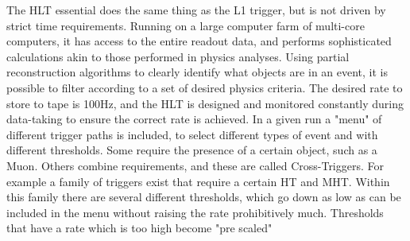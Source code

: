 The HLT essential does the same thing as the L1 trigger, but is not driven by strict time requirements. Running on a large computer farm of multi-core computers, it has access to the entire readout data, and performs sophisticated calculations akin to those performed in physics analyses. Using partial reconstruction algorithms to clearly identify what objects are in an event, it is possible to filter according to a set of desired physics criteria.  The desired rate to store to tape is 100Hz, and the HLT is designed and monitored constantly during data-taking to ensure the correct rate is achieved. In a given run a "menu" of different trigger paths is included, to select different types of event and with different thresholds. Some require the presence of a certain object, such as a Muon. Others combine requirements, and these are called Cross-Triggers. For example a family of triggers exist that require a certain HT and MHT. Within this family there are several different thresholds, which go down as low as can be included in the menu without raising the rate prohibitively much. Thresholds that have a rate which is too high become "pre scaled"



